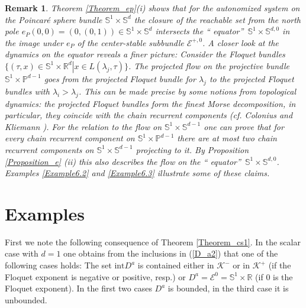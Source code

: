 \documentclass{siamltex}%
\newtheorem{remark}[theorem]{Remark}
\begin{document}
\begin{remark}
\label{Remark5.4}Theorem \ref{Theorem_ep}(i) shows that for the autonomized
system on the Poincar\'{e} sphere bundle $\mathbb{S}^{1}\times\mathbb{S}^{d}$
the closure of the reachable set from the north pole $e_{P}(0,0)=(0,(0,1))\in
\mathbb{S}^{1}\times\mathbb{S}^{d}$ intersects the \textquotedblleft
equator\textquotedblright\ $\mathbb{S}^{1}\times\mathbb{S}^{d,0}$ in the image
under $e_{P}$ of the center-stable subbundle $\mathcal{E}^{+,0}$. A closer
look at the dynamics on the equator reveals a finer picture: Consider the
Floquet bundles $\{(\tau,x)\in\mathbb{S}^{1}\times\mathbb{R}^{d}\left\vert
x\in L(\lambda_{j},\tau)\right.  \}$. The projected flow on the projective
bundle $\mathbb{S}^{1}\times\mathbb{P}^{d-1}$ goes from the projected Floquet
bundle for $\lambda_{j}$ to the projected Floquet bundles with $\lambda
_{i}>\lambda_{j}$. This can be made precise by some notions from topological
dynamics: the projected Floquet bundles form the finest Morse decomposition,
in particular, they coincide with the chain recurrent components (cf. Colonius
and Kliemann \cite[Section 7.2 and Theorem 8.3.3]{ColK14}). For the relation
to the flow on $\mathbb{S}^{1}\times\mathbb{S}^{d-1}$ one can prove that for
every chain recurrent component on $\mathbb{S}^{1}\times\mathbb{P}^{d-1}$
there are at most two chain recurrent components on $\mathbb{S}^{1}%
\times\mathbb{S}^{d-1}$ projecting to it. By Proposition \ref{Proposition_e}%
(ii) this also describes the flow on the \textquotedblleft
equator\textquotedblright\ $\mathbb{S}^{1}\times\mathbb{S}^{d,0}$. Examples
\ref{Example6.2} and \ref{Example6.3} illustrate some of these claims.
\end{remark}

\section{Examples\label{Section6}}

First we note the following consequence of Theorem \ref{Theorem_cs1}. In the
scalar case with $d=1$ one obtains from the inclusions in (\ref{D_a2}) that
one of the following cases holds: The set $\mathrm{int}D^{a}$ is contained
either in $\mathcal{K}^{-}$ or in $\mathcal{K}^{+}$ (if the Floquet exponent
is negative or positive, resp.) or $D^{a}=\mathcal{E}^{0}=\mathbb{S}^{1}%
\times\mathbb{R}$ (if $0$ is the Floquet exponent). In the first two cases
$D^{a}$ is bounded, in the third case it is unbounded.
\end{document}
